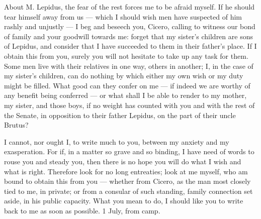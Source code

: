 

 About M. Lepidus, the fear of the rest forces me to be afraid myself. If he should tear himself away from us --- which I should wish men have suspected of him rashly and unjustly --- I beg and beseech you, Cicero, calling to witness our bond of family and your goodwill towards me: forget that my sister's children are sons of Lepidus, and consider that I have succeeded to them in their father's place. If I obtain this from you, surely you will not hesitate to take up any task for them. Some men live with their relatives in one way, others in another; I, in the case of my sister's children, can do nothing by which either my own wish or my duty might be filled. What good can they confer on me --- if indeed we are worthy of any benefit being conferred --- or what shall I be able to render to my mother, my sister, and those boys, if no weight has counted with you and with the rest of the Senate, in opposition to their father Lepidus, on the part of their uncle Brutus?

 I cannot, nor ought I, to write much to you, between my anxiety and my exasperation. For if, in a matter so grave and so binding, I have need of words to rouse you and steady you, then there is no hope you will do what I wish and what is right. Therefore look for no long entreaties; look at me myself, who am bound to obtain this from you --- whether from Cicero, as the man most closely tied to me, in private; or from a consular of such standing, family connection set aside, in his public capacity. What you mean to do, I should like you to write back to me as soon as possible. 1 July, from camp.
